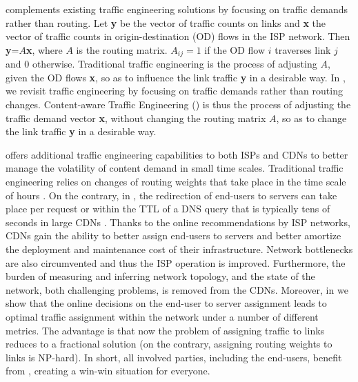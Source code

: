 \cate complements existing traffic engineering solutions
\cite{ietf-alto-protocol,TECDN,CooperativeISPCDN,BeyondMLU,CooperativeISPCDN:Workshop,p4p}
by focusing on traffic demands rather than routing.  Let {\bf y} be the vector
of traffic counts on links and {\bf x} the vector of traffic counts in
origin-destination (OD) flows in the ISP network.  Then {\bf y}=$A${\bf x},
where $A$ is the routing matrix. $A_{ij}=1$ if the OD flow $i$ traverses link
$j$ and $0$ otherwise.  Traditional traffic engineering is the process of
adjusting $A$, given the OD flows {\bf x}, so as to influence the link traffic
{\bf y} in a desirable way.  In \cate, we revisit traffic engineering by
focusing on traffic demands rather than routing changes. Content-aware Traffic
Engineering (\cate) is thus the process of adjusting the traffic demand vector
{\bf x}, without changing the routing matrix $A$, so as to change the link traffic {\bf y}
in a desirable way.

\cate offers additional traffic engineering capabilities to both ISPs and CDNs
to better manage the volatility of content demand in small time scales.
Traditional traffic engineering
\cite{ietf-alto-protocol,TECDN,CooperativeISPCDN,BeyondMLU,CooperativeISPCDN:Workshop,p4p}
relies on changes of routing weights that take place in the time scale of hours
\cite{FT01}.  On the contrary, in \cate, the redirection of end-users to servers can take place
per request or within the TTL of a DNS query that is typically tens of seconds
in large CDNs \cite{PADIS2010}.  Thanks to the online recommendations by ISP
networks, CDNs gain the ability to better assign end-users to servers and
better amortize the deployment and maintenance cost of their infrastructure.
Network bottlenecks are also circumvented and thus the ISP operation is
improved.  Furthermore, the burden of measuring and inferring network topology,
and the state of the network, both challenging problems, is removed from the
CDNs. Moreover, in \cite[Sections 4 and 5]{CaTE-TR} we show that the online
\cate decisions on the end-user to server assignment leads to optimal traffic
assignment within the network under a number of different metrics.  The
advantage is that now the problem of assigning traffic to links reduces to a
fractional solution (on the contrary, assigning routing weights to links is
NP-hard).  In short, all involved parties, including the end-users, benefit
from \cate, creating a win-win situation for everyone.





